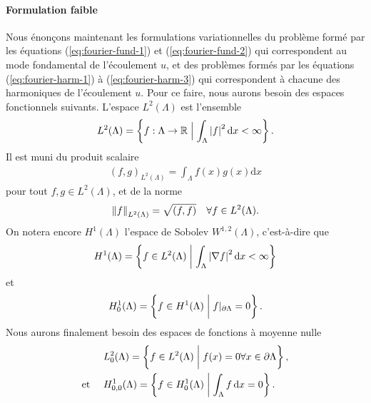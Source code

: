 \paragraph{Formulation faible}\label{sec:stokes-fourier-weak}
Nous énonçons maintenant les formulations variationnelles du problème
formé par les équations (\ref{eq:fourier-fund-1}) et
(\ref{eq:fourier-fund-2}) qui correspondent au mode fondamental de
l'écoulement $u$, et des problèmes formés par les équations
(\ref{eq:fourier-harm-1}) à (\ref{eq:fourier-harm-3}) qui
correspondent à chacune des harmoniques de l'écoulement $u$. Pour ce
faire, nous aurons besoin des espaces fonctionnels suivants. L'espace
$L^2(\Lambda)$ est l'ensemble
\begin{align}
  L^2(\Lambda) = \left\{ f:\Lambda\to\mathbb R \mathrel{\Big|} \int_\Lambda
    \left\lvert f \right\rvert^2\mathrm dx < \infty \right\}.
\end{align}
Il est muni du produit scalaire
\begin{align}
  (f, g)_{L^2(\Lambda)} = \int_\Lambda f(x)g(x)\mathrm dx
\end{align}
pour tout $f, g\in L^2(\Lambda)$, et de la norme
\begin{align}
  \left\lVert f \right\rVert_{L^2(\Lambda)} = \sqrt{(f, f)}\quad\forall f\in L^2(\Lambda).
\end{align}
On notera encore $H^1(\Lambda)$ l'espace de Sobolev
$W^{1,2}(\Lambda)$, c'est-à-dire que
\begin{align}
  H^1(\Lambda) = \left\{ f\in L^2(\Lambda)\mathrel{\bigg|} \int_\Lambda
    \left\lvert \nabla f \right\rvert^2 \mathrm dx < \infty \right\}
\end{align}
et
\begin{align}
  H^1_0(\Lambda) = \left\{ f \in H^1(\Lambda) \mathrel{\bigg|}
    f|_{\partial \Lambda} = 0 \right\}.
\end{align}
Nous aurons finalement besoin des espaces de fonctions à moyenne nulle
\begin{align}
  &L^2_0(\Lambda) = \left\{ f\in L^2(\Lambda)\mathrel{\bigg|} f(x) = 0 \forall
    x\in \partial\Lambda \right\},\\
  \text{et }\quad &H^1_{0,0}(\Lambda) = \left\{ f\in H^1_0(\Lambda)\mathrel{\bigg|}
    \int_\Lambda f \,\mathrm dx = 0 \right\}.
\end{align}

